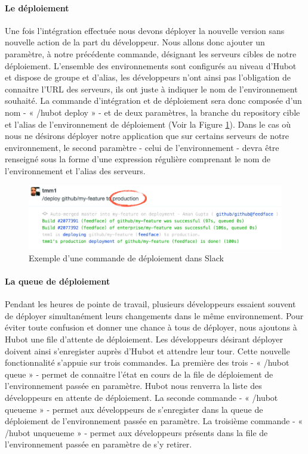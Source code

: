           \paragraph{Le déploiement} Une fois l'intégration effectuée nous devons déployer la nouvelle version sans nouvelle action de la part du développeur. Nous allons donc ajouter un paramètre, à notre précédente commande, désignant les serveurs cibles de notre déploiement. L'ensemble des environnements sont configurés au niveau d'Hubot et dispose de groupe et d'alias, les développeurs n'ont ainsi pas l'obligation de connaitre l'URL des serveurs, ils ont juste à indiquer le nom de l'environnement souhaité.
          La commande d'intégration et de déploiement sera donc composée d'un nom - « /hubot deploy » - et de deux paramètres, la branche du repository cible et l'alias de l'environnement de déploiement (Voir la Figure \ref{SlackDeploy}).
          Dans le cas où nous ne désirons déployer notre application que sur certains serveurs de notre environnement, le second paramètre - celui de l'environnement - devra être renseigné sous la forme d'une expression régulière comprenant le nom de l'environnement et l'alias des serveurs.

          \begin{figure}
            \begin{center}
              \includegraphics[scale=0.5]{images/SlackDeploy.png}
            \end{center}
            \caption{Exemple d'une commande de déploiement dans Slack}
            \label{SlackDeploy}
          \end{figure}

          \paragraph{La queue de déploiement} Pendant les heures de pointe de travail, plusieurs développeurs essaient souvent de déployer simultanément leurs changements dans le même environnement. Pour éviter toute confusion et donner une chance à tous de déployer, nous ajoutons à Hubot une file d'attente de déploiement. Les développeurs désirant déployer doivent ainsi s'enregister auprès d'Hubot et attendre leur tour. Cette nouvelle fonctionnalité s'appuie sur trois commandes.
          La première des trois - « /hubot queue » - permet de connaitre l'état en cours de la file de déploiement de l'environnement passée en paramètre. Hubot nous renverra la liste des développeurs en attente de déploiement.
          La seconde commande - « /hubot queueme » - permet aux développeurs de s'enregister dans la queue de déploiement de l'environnement passée en paramètre.
          La troisième commande - « /hubot unqueueme » - permet aux développeurs présents dans la file de l'environnement passée en paramètre de s'y retirer.

